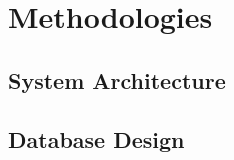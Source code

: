 \documentclass{article}
\makeatletter
\newcommand\subsubsubsection{\@startsection{paragraph}{4}{\z@}{-2.5ex\@plus -1ex \@minus -.25ex}{1.25ex \@plus .25ex}{\normalfont\normalsize\bfseries}}
\makeatother
\begin{document}










\section{Methodologies}
\subsection{System Architecture}
\subsection{Database Design}
\end{document}
